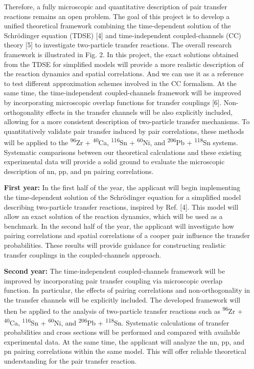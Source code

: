 \documentclass[10pt]{article}
\newcommand{\plansub}[1]{\par\vspace{0.9em}\noindent{\fontsize{11}{13.5}\selectfont\bfseries #1}\par\vspace{0.3em}}
\begin{document}
\plansub{Purpose of proposed research}

Therefore, a fully microscopic and quantitative description of pair transfer reactions remains an open problem. The goal of this project is to develop a unified theoretical framework combining the time-dependent solution of the Schrödinger equation (TDSE) [4] and time-independent coupled-channels (CC) theory [5] to investigate two-particle transfer reactions. The overall research framework is illustrated in Fig. 2.
In this project, the exact solutions obtained from the TDSE for simplified
models will provide a more realistic description of the reaction dynamics
and spatial correlations. And we can use it as a reference to test different
approximation schemes involved in the CC formalism. At the same time,
the time-independent coupled-channels framework will be improved by incorporating microscopic overlap functions for transfer couplings [6]. Non-orthogonality effects in the transfer channels will be also explicitly included, allowing for a more consistent description of two-particle transfer mechanisms.
To quantitatively validate pair transfer induced by pair correlations, these methods will be applied to the \textsuperscript{96}Zr + \textsuperscript{40}Ca, \textsuperscript{116}Sn + \textsuperscript{60}Ni, and \textsuperscript{206}Pb + \textsuperscript{118}Sn systems. Systematic comparisons between our theoretical calculations and these existing experimental data will provide a solid ground to evaluate the microscopic description of nn, pp, and pn pairing correlations.

\plansub{Proposed plan}

\textbf{First year:} In the first half of the year, the applicant will begin implementing the time-dependent solution of the Schrödinger equation for a simplified model describing two-particle transfer reactions, inspired by Ref. [4]. This model will allow an exact solution of the reaction dynamics, which will be used as a benchmark. In the second half of the year, the applicant will investigate how pairing correlations and spatial correlations of a cooper pair influence the transfer probabilities. These results will provide guidance for constructing realistic transfer couplings in the coupled-channels approach.
\par\textbf{Second year:} The time-independent coupled-channels framework will be improved by incorporating pair transfer coupling via microscopic overlap function. In particular, the effects of pairing correlations and non-orthogonality in the transfer channels will be explicitly included. The developed framework will then be applied to the analysis of two-particle transfer reactions such as \textsuperscript{96}Zr + \textsuperscript{40}Ca, \textsuperscript{116}Sn + \textsuperscript{60}Ni, and \textsuperscript{206}Pb + \textsuperscript{118}Sn. Systematic calculations of transfer probabilities and cross sections will be performed and compared with available experimental data. At the same time, the applicant will analyze the nn, pp, and pn pairing correlations within the same model. This will offer reliable theoretical understanding for the pair transfer reaction.
\end{document}
